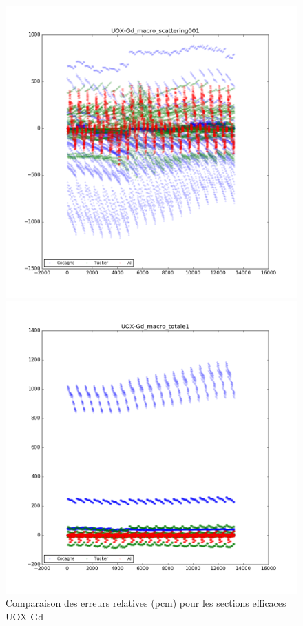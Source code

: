 \begin{center}
\begin{figure}[h]
\begin{minipage}[b]{0.5\linewidth}
   \end{minipage}
	 \begin{minipage}[b]{0.5\linewidth}
			\centering \includegraphics[scale=0.3]{images/UOX-Gd/UOX-Gd_macro_scattering001.png}
	 \end{minipage}
	 \begin{minipage}[b]{0.5\linewidth}
			\centering \includegraphics[scale=0.3]{images/UOX-Gd/UOX-Gd_macro_totale1.png}
	 \end{minipage}
	 \caption{Comparaison des erreurs relatives (pcm) pour les sections efficaces UOX-Gd}
\end{figure}
\end{center}

